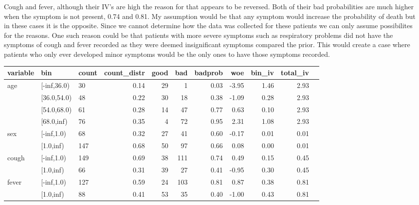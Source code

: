 Cough and fever, although their IV's are high the reason for that appears to be reversed. Both of their bad probabilities are much higher when the symptom is not present, 0.74 and 0.81. My assumption would be that any symptom would increase the probability of death but in these cases it is the opposite. Since we cannot determine how the data was collected for these patients we can only assume possibilites for the reasons. One such reason could be that patients with more severe symptoms such as respiratory problems did not have the symptoms of cough and fever recorded as they were deemed insignificant symptoms compared the prior. This would create a case where patients who only ever developed minor symptoms would be the only ones to have those symptoms recorded. \\

\begin{table}[H]
	\centering
	\begin{tabular}{lllrrrrrrrr}
		\toprule
		variable & bin &  count &  count\_distr &  good &  bad &   badprob &       woe &    bin\_iv &  total\_iv \\
		\midrule
		         age &  [-inf,36.0) &     30 &         0.14 &    29 &    1 &     0.03 & -3.95 &    1.46 &      2.93 \\
		      &  [36.0,54.0) &     48 &         0.22 &    30 &   18 &     0.38 & -1.09 &    0.28 &      2.93 \\
		      &  [54.0,68.0) &     61 &         0.28 &    14 &   47 &     0.77 &  0.63 &    0.10 &      2.93 \\
		      &   [68.0,inf) &     76 &         0.35 &     4 &   72 &     0.95 &  2.31 &    1.08 &      2.93 \\
		\midrule
		 sex &  [-inf,1.0) &     68 &         0.32 &    27 &   41 &     0.60 & -0.17 &    0.01 &      0.01 \\
    		  &   [1.0,inf) &    147 &         0.68 &    50 &   97 &     0.66 &  0.08 &    0.00 &      0.01 \\
		\midrule
		  cough &  [-inf,1.0) &    149 &         0.69 &    38 &  111 &     0.74 &  0.49 &    0.15 &      0.45 \\
  		  &   [1.0,inf) &     66 &         0.31 &    39 &   27 &     0.41 & -0.95 &    0.30 &      0.45 \\
		\midrule
		  fever &  [-inf,1.0) &    127 &         0.59 &    24 &  103 &     0.81 &  0.87 &    0.38 &      0.81 \\
  		  &   [1.0,inf) &     88 &         0.41 &    53 &   35 &     0.40 & -1.00 &    0.43 &      0.81 \\

\end{tabular}
\end{table}
